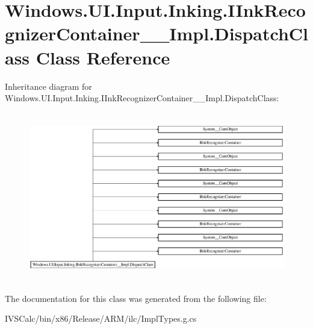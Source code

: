 \hypertarget{class_windows_1_1_u_i_1_1_input_1_1_inking_1_1_i_ink_recognizer_container_____impl_1_1_dispatch_class}{}\section{Windows.\+U\+I.\+Input.\+Inking.\+I\+Ink\+Recognizer\+Container\+\_\+\+\_\+\+Impl.\+Dispatch\+Class Class Reference}
\label{class_windows_1_1_u_i_1_1_input_1_1_inking_1_1_i_ink_recognizer_container_____impl_1_1_dispatch_class}
Inheritance diagram for Windows.\+U\+I.\+Input.\+Inking.\+I\+Ink\+Recognizer\+Container\+\_\+\+\_\+\+Impl.\+Dispatch\+Class\+:\begin{figure}[H]
\begin{center}
\leavevmode
\includegraphics[height=7.421687cm]{class_windows_1_1_u_i_1_1_input_1_1_inking_1_1_i_ink_recognizer_container_____impl_1_1_dispatch_class}
\end{center}
\end{figure}


The documentation for this class was generated from the following file\+:\begin{DoxyCompactItemize}
\item 
I\+V\+S\+Calc/bin/x86/\+Release/\+A\+R\+M/ilc/Impl\+Types.\+g.\+cs\end{DoxyCompactItemize}
